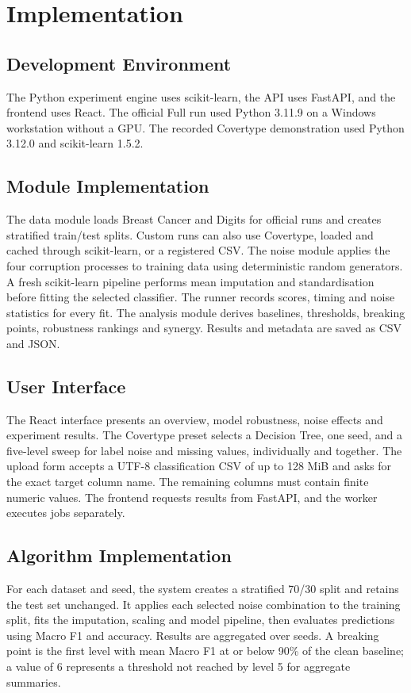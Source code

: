\chapter{Implementation}
\section{Development Environment}
The Python experiment engine uses scikit-learn, the API uses FastAPI, and the frontend uses React. The official Full run used Python 3.11.9 on a Windows workstation without a GPU. The recorded Covertype demonstration used Python 3.12.0 and scikit-learn 1.5.2.
\section{Module Implementation}
The data module loads Breast Cancer and Digits for official runs and creates stratified train/test splits. Custom runs can also use Covertype, loaded and cached through scikit-learn, or a registered CSV. The noise module applies the four corruption processes to training data using deterministic random generators. A fresh scikit-learn pipeline performs mean imputation and standardisation before fitting the selected classifier. The runner records scores, timing and noise statistics for every fit. The analysis module derives baselines, thresholds, breaking points, robustness rankings and synergy. Results and metadata are saved as CSV and JSON.
\section{User Interface}
The React interface presents an overview, model robustness, noise effects and experiment results. The Covertype preset selects a Decision Tree, one seed, and a five-level sweep for label noise and missing values, individually and together. The upload form accepts a UTF-8 classification CSV of up to 128 MiB and asks for the exact target column name. The remaining columns must contain finite numeric values. The frontend requests results from FastAPI, and the worker executes jobs separately.
\section{Algorithm Implementation}
For each dataset and seed, the system creates a stratified 70/30 split and retains the test set unchanged. It applies each selected noise combination to the training split, fits the imputation, scaling and model pipeline, then evaluates predictions using Macro F1 and accuracy. Results are aggregated over seeds. A breaking point is the first level with mean Macro F1 at or below 90\% of the clean baseline; a value of 6 represents a threshold not reached by level 5 for aggregate summaries.
